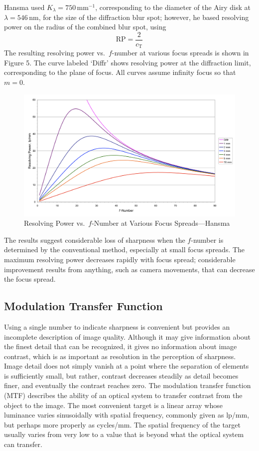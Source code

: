 \documentclass[11pt, oneside]{scrartcl}   	%
\begin{document}
Hansma used $K_λ = 750\,\mathrm{mm}^{-1}$, corresponding to the diameter of the Airy disk at
$λ = 546\,\mathrm{nm}$, for the size of the diffraction blur spot; however, he based resolving power on the radius of the combined blur spot, using
\begin{equation}
\mathrm{RP}= \frac2 {c_\mathrm{T}}
\end{equation}
The resulting resolving power vs.\ $f$-number at various focus spreads is shown in Figure 5. The curve labeled ‘\textsf{\small Diffr}’ shows resolving power at the diffraction limit, corresponding to the plane of focus. All curves assume infinity focus so that $m = 0$.
\begin{figure}[htbp] %
   \centering
   \includegraphics[width=\linewidth]{figure/fig_dofd_5} 
   \caption{Resolving Power vs.\ $f$-Number at Various Focus Spreads---Hansma}
   \label{fig:respow}
\end{figure}
The results suggest considerable loss of sharpness when the $f$-number is determined by the conventional method, especially at small focus spreads. The maximum resolving power decreases rapidly with focus spread; considerable improvement results from anything, such as camera movements, that can decrease the focus spread.
\subsection{Modulation Transfer Function}

Using a single number to indicate sharpness is convenient but provides an incomplete description of image quality. Although it may give information about the finest detail that can be recognized, it gives no information about image contrast, which is as important as resolution in the perception of sharpness. Image detail does not simply vanish at a point where the separation of elements is sufficiently small, but rather, contrast decreases steadily as detail becomes finer, and eventually the contrast reaches zero. The modulation transfer function (MTF) describes the ability of an optical system to transfer contrast from the object to the image. The most convenient target is a linear array whose luminance varies sinusoidally with spatial frequency, commonly given as lp/mm, but perhaps more properly as cycles/mm. The spatial frequency of the target usually varies from very low to a value that is beyond what the optical system can transfer.
\end{document}
